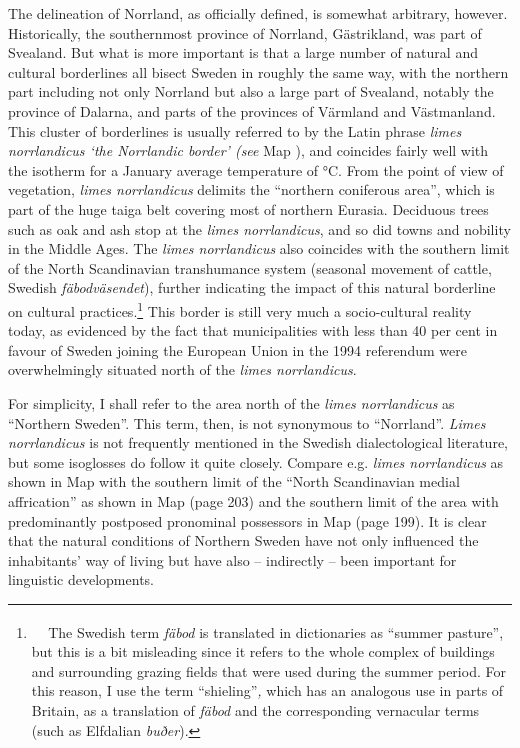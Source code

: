 \begin{styleBodytextC}
The delineation of Norrland, as officially defined, is somewhat arbitrary, however. Historically, the southernmost province of Norrland, Gästrikland, was part of Svealand. But what is more important is that a large number of natural and cultural borderlines all bisect Sweden in roughly the same way, with the northern part including not only Norrland but also a large part of Svealand, notably the province of Dalarna, and parts of the provinces of Värmland and Västmanland. This cluster of borderlines is usually referred to by the Latin phrase \textit{limes norrlandicu}\textit{s ‘the Norrlandic border’ (see }Map ), and coincides fairly well with the isotherm for a January average temperature of °C. From the point of view of vegetation, \textit{limes norrlandicus} delimits the “northern coniferous area”, which is part of the huge taiga belt covering most of northern Eurasia. Deciduous trees such as oak and ash stop at the \textit{limes norrlandicus}, and so did towns and nobility in the Middle Ages. The \textit{limes norrlandicus} also coincides with the southern limit of the North Scandinavian transhumance system (seasonal movement of cattle, Swedish \textit{fäbodväsendet}), further indicating the impact of this natural borderline on cultural practices.\footnote{\textsuperscript{\ \ } The Swedish term \textit{fäbod }is translated in dictionaries as “summer pasture”, but this is a bit misleading since it refers to the whole complex of buildings and surrounding grazing fields that were used during the summer period. For this reason, I use the term “shieling”\textit{, }which has an analogous use in parts of Britain, as a translation of \textit{fäbod} and the corresponding vernacular terms (such as Elfdalian \textit{buðer}).} This border is still very much a socio-cultural reality today, as evidenced by the fact that municipalities with less than 40 per cent in favour of Sweden joining the European Union in the 1994 referendum were overwhelmingly situated north of the \textit{limes norrlandicus}.

\end{styleBodytextC}

\begin{styleBodytextC}
For simplicity, I shall refer to the area north of the \textit{limes norrlandicus} as “Northern Sweden”. This term, then, is not synonymous to “Norrland”. \textit{Limes norrlandicus} is not frequently mentioned in the Swedish dialectological literature, but some isoglosses do follow it quite closely. Compare e.g. \textit{limes norrlandicus} as shown in Map  with the southern limit of the “North Scandinavian medial affrication” as shown in Map  (page 203\pageref{bkm:Ref134258492}) and the southern limit of the area with predominantly postposed pronominal possessors in Map  (page 199). It is clear that the natural conditions of Northern Sweden have not only influenced the inhabitants’ way of living but have also – indirectly – been important for linguistic developments.

\end{styleBodytextC}

